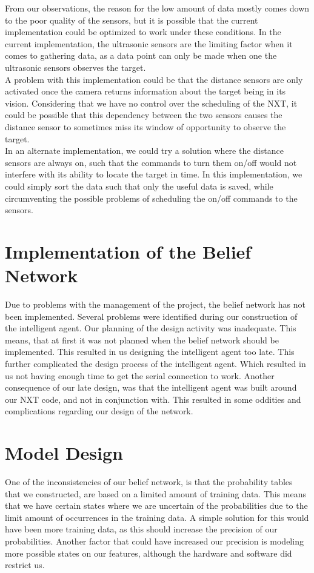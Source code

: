 From our observations, the reason for the low amount of data mostly comes down
to the poor quality of the sensors, but it is possible that the current
implementation could be optimized to work under these conditions. In the current
implementation, the ultrasonic sensors are the limiting factor when it comes to
gathering data, as a data point can only be made when one the ultrasonic sensors
observes the target.\\
A problem with this implementation could be that the distance sensors are only
activated once the camera returns information about the target being in its
vision. Considering that we have no control over the scheduling of the NXT, it
could be possible that this dependency between the two sensors causes the
distance sensor to sometimes miss its window of opportunity to observe the
target.\\
In an alternate implementation, we could try a solution where the distance
sensors are always on, such that the commands to turn them on/off would not
interfere with its ability to locate the target in time. In this implementation,
we could simply sort the data such that only the useful data is saved, while
circumventing the possible problems of scheduling the on/off commands to the
sensors.

\section{Implementation of the Belief Network}
Due to problems with the management of the project, the belief network has
not been implemented. Several problems were identified during our construction
of the intelligent agent. Our planning of the design activity was inadequate.
This means, that at first it was not planned when the belief network should be
implemented. This resulted in us designing the intelligent agent
too late. 
This further complicated the design process of the intelligent agent. Which
resulted in us not having enough time to get the serial connection to work.
Another consequence of our late design, was that the intelligent agent was built
around our NXT code, and not in conjunction with. This resulted in some oddities and
complications regarding our design of the network.


\section{Model Design}%
One of the inconsistencies of our belief network, is that the probability tables
that we constructed, are based on a limited amount of training data. This
means that we have certain states where we are uncertain of the probabilities
due to the limit amount of occurrences in the training data.
A simple solution for this would have been more training data, as this should
increase the precision of our probabilities. Another factor that could have
increased our precision is modeling more possible states on our features,
although the hardware and software did restrict us.

